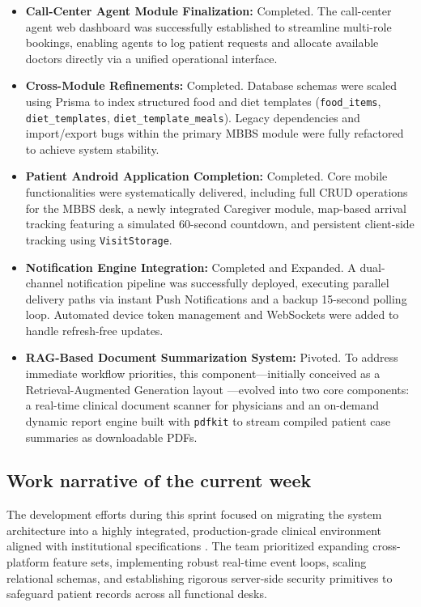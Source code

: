 \documentclass[onecolumn,journal]{IEEEtran}
\begin{document}
	\begin{itemize}
		\item \textbf{Call-Center Agent Module Finalization:} Completed. The call-center agent web dashboard was successfully established to streamline multi-role bookings, enabling agents to log patient requests and allocate available doctors directly via a unified operational interface.
		\item \textbf{Cross-Module Refinements:} Completed. Database schemas were scaled using Prisma to index structured food and diet templates (\texttt{food\_items}, \texttt{diet\_templates}, \texttt{diet\_template\_meals}). Legacy dependencies and import/export bugs within the primary MBBS module were fully refactored to achieve system stability. 
		\item \textbf{Patient Android Application Completion:} Completed. Core mobile functionalities were systematically delivered, including full CRUD operations for the MBBS desk, a newly integrated Caregiver module, map-based arrival tracking featuring a simulated 60-second countdown, and persistent client-side tracking using \texttt{VisitStorage}.
		\item \textbf{Notification Engine Integration:} Completed and Expanded. A dual-channel notification pipeline was successfully deployed, executing parallel delivery paths via instant Push Notifications and a backup 15-second polling loop. Automated device token management and WebSockets \cite{fette2011websocket} were added to handle refresh-free updates.
		\item \textbf{RAG-Based Document Summarization System:} Pivoted. To address immediate workflow priorities, this component—initially conceived as a Retrieval-Augmented Generation layout \cite{rag2020}—evolved into two core components: a real-time clinical document scanner for physicians and an on-demand dynamic report engine built with \texttt{pdfkit} to stream compiled patient case summaries as downloadable PDFs.
	\end{itemize}
	
	\subsection{Work narrative of the current week}
	
	The development efforts during this sprint focused on migrating the system architecture into a highly integrated, production-grade clinical environment aligned with institutional specifications \cite{srs2026}. The team prioritized expanding cross-platform feature sets, implementing robust real-time event loops, scaling relational schemas, and establishing rigorous server-side security primitives to safeguard patient records across all functional desks.
	
\end{document}
